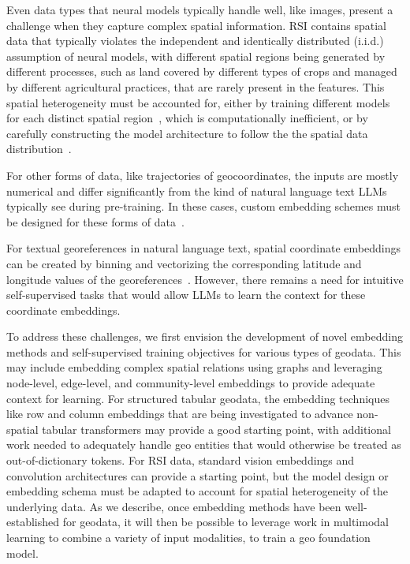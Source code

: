 Even data types that neural models typically handle well, like images, present a challenge when they capture complex spatial information.
%
RSI contains spatial data that typically violates the independent and identically distributed (i.i.d.) assumption of neural models, with different spatial regions being generated by different processes, such as land covered by different types of crops and managed by different agricultural practices, that are rarely present in the features. 
This spatial heterogeneity must be accounted for, either by training different models for each distinct spatial region~\cite{Gupta2021}, which is computationally inefficient, or by carefully constructing the model architecture to follow the the spatial data distribution~\cite{Xie2021b}.


For other forms of data, like trajectories of geocoordinates, the inputs are mostly numerical and differ significantly from the kind of natural language text LLMs typically see during pre-training.
In these cases, custom embedding schemes must be designed for these forms of data~\cite{Hu2023}.
%
%

For textual georeferences in natural language text, spatial coordinate embeddings can be created by binning and vectorizing the corresponding latitude and longitude values of the georeferences~\cite{Li2021}.
However, there remains a need for intuitive self-supervised tasks that would allow LLMs to learn the context for these coordinate embeddings.
%


To address these challenges, we first envision the development of novel embedding methods and self-supervised training objectives for various types of geodata.
This may include embedding complex spatial relations using graphs and leveraging node-level, edge-level, and community-level embeddings to provide adequate context for learning.
For structured tabular geodata, the embedding techniques like row and column embeddings that are being investigated to advance non-spatial tabular transformers may provide a good starting point, with additional work needed to adequately handle geo entities that would otherwise be treated as out-of-dictionary tokens.
For RSI data, standard vision embeddings and convolution architectures can provide a starting point, but the model design or embedding schema must be adapted to account for spatial heterogeneity of the underlying data.
%
As we describe, once embedding methods have been well-established for geodata, it will then be possible to leverage work in multimodal learning to combine a variety of input modalities, to train a geo foundation model.

